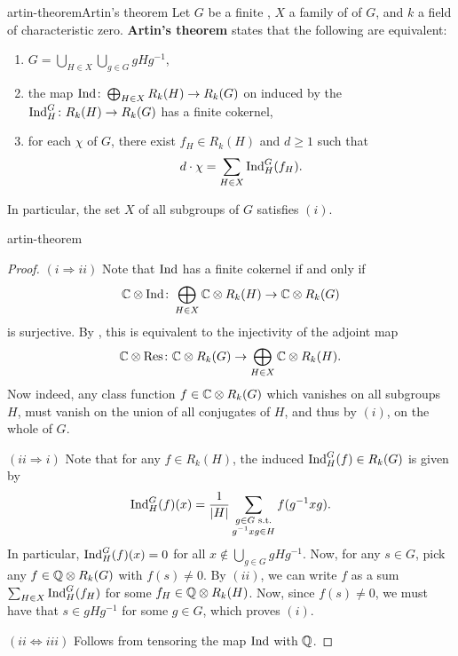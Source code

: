 \begin{topic}{artin-theorem}{Artin's theorem}
    Let $G$ be a finite , $X$ a family of  of $G$, and $k$ a field of characteristic zero. \textbf{Artin's theorem} states that the following are equivalent:
    \begin{enumerate}[label=(\roman*)]
        \item $G = \bigcup_{H \in X} \bigcup_{g \in G} g H g^{-1}$,
        \item the map $\textup{Ind} \colon \bigoplus_{H \in X} R_k(H) \to R_k(G)$ on  induced by the  $\textup{Ind}_H^G \colon R_k(H) \to R_k(G)$ has a finite cokernel,
        \item for each  $\chi$ of $G$, there exist $f_H \in R_k(H)$ and $d \ge 1$ such that
        \[ d \cdot \chi = \sum_{H \in X} \textup{Ind}_H^G(f_H) . \]
    \end{enumerate}
    In particular, the set $X$ of all  subgroups of $G$ satisfies $(i)$.
\end{topic}

\begin{example}{artin-theorem}
    \begin{proof}
        $(i \Rightarrow ii)$ Note that $\textup{Ind}$ has a finite cokernel if and only if
        \[ \mathbb{C} \otimes \textup{Ind} \colon \bigoplus_{H \in X} \mathbb{C} \otimes R_k(H) \to \mathbb{C} \otimes R_k(G) \]
        is surjective. By , this is equivalent to the injectivity of the adjoint map
        \[ \mathbb{C} \otimes \textup{Res} \colon \mathbb{C} \otimes R_k(G) \to \bigoplus_{H \in X} \mathbb{C} \otimes R_k(H) . \]
        Now indeed, any class function $f \in \mathbb{C} \otimes R_k(G)$ which vanishes on all subgroups $H$, must vanish on the union of all conjugates of $H$, and thus by $(i)$, on the whole of $G$.
        
        $(ii \Rightarrow i)$ Note that for any $f \in R_k(H)$, the induced $\textup{Ind}_H^G(f) \in R_k(G)$ is given by
        \[ \textup{Ind}_H^G(f)(x) = \frac{1}{|H|} \sum_{\substack{g \in G \textup{ s.t.} \\ g^{-1} x g \in H }} f(g^{-1} x g) . \]
        In particular, $\textup{Ind}_H^G(f)(x) = 0$ for all $x \not\in \bigcup_{g \in G} g H g^{-1}$. Now, for any $s \in G$, pick any $f \in \mathbb{Q} \otimes R_k(G)$ with $f(s) \ne 0$. By $(ii)$, we can write $f$ as a sum $\sum_{H \in X} \textup{Ind}_H^G(f_H)$ for some $f_H \in \mathbb{Q} \otimes R_k(H)$. Now, since $f(s) \ne 0$, we must have that $s \in g H g^{-1}$ for some $g \in G$, which proves $(i)$.
        
        $(ii \Leftrightarrow iii)$ Follows from tensoring the map $\textup{Ind}$ with $\mathbb{Q}$.
    \end{proof}
\end{example}

